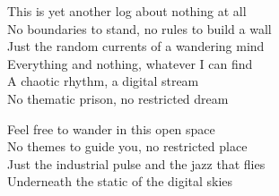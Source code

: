 \begin{lyrics}
This is yet another log about nothing at all\\
No boundaries to stand, no rules to build a wall\\
Just the random currents of a wandering mind\\
Everything and nothing, whatever I can find\\
A chaotic rhythm, a digital stream\\
No thematic prison, no restricted dream

Feel free to wander in this open space\\
No themes to guide you, no restricted place\\
Just the industrial pulse and the jazz that flies\\
Underneath the static of the digital skies
\end{lyrics}
